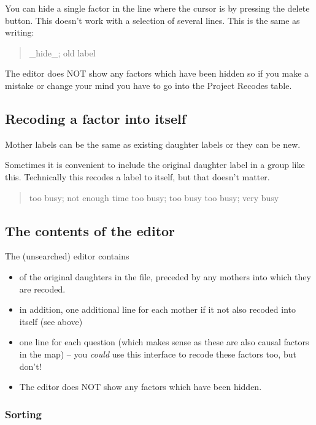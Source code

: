 \documentclass[
]{book}
\providecommand{\tightlist}{%
  \setlength{\itemsep}{0pt}\setlength{\parskip}{0pt}}
\begin{document}
You can hide a single factor in the line where the cursor is by pressing the delete button. This doesn't work with a selection of several lines. This is the same as writing:

\begin{quote}
\_hide\_; old label
\end{quote}

The editor does NOT show any factors which have been hidden so if you make a mistake or change your mind you have to go into the Project Recodes table.

\hypertarget{recoding-a-factor-into-itself}{%
\subsection{Recoding a factor into itself}\label{recoding-a-factor-into-itself}}

Mother labels can be the same as existing daughter labels or they can be new.

Sometimes it is convenient to include the original daughter label in a group like this. Technically this recodes a label to itself, but that doesn't matter.

\begin{quote}
too busy; not enough time
too busy; too busy
too busy; very busy
\end{quote}

\hypertarget{the-contents-of-the-editor}{%
\subsection{The contents of the editor}\label{the-contents-of-the-editor}}

The (unsearched) editor contains

\begin{itemize}
\tightlist
\item
  of the original daughters in the file, preceded by any mothers into which they are recoded.
\item
  in addition, one additional line for each mother if it not also recoded into itself (see above)
\item
  one line for each question (which makes sense as these are also causal factors in the map) -- you \emph{could} use this interface to recode these factors too, but don't!
\item
  The editor does NOT show any factors which have been hidden.
\end{itemize}

\hypertarget{sorting-2}{%
\subsubsection{Sorting}\label{sorting-2}}
\end{document}
